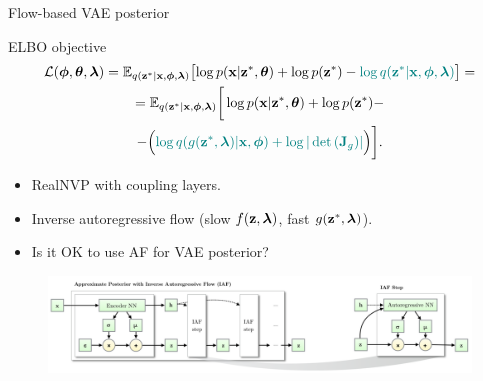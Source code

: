 \begin{frame}{Flow-based VAE posterior}
	\begin{block}{ELBO objective}
		\vspace{-0.5cm}
		{ \small
			\begin{multline*}
				\mathcal{L} (\boldsymbol{\phi}, \boldsymbol{\theta}, \boldsymbol{\lambda})  
				= \mathbb{E}_{q(\mathbf{z}^* | \mathbf{x}, \boldsymbol{\phi}, \boldsymbol{\lambda})} \bigl[\log p(\mathbf{x} | \mathbf{z}^*, \boldsymbol{\theta}) + \log p(\mathbf{z}^*) - {\color{teal}\log q(\mathbf{z}^*| \mathbf{x}, \boldsymbol{\phi}, \boldsymbol{\lambda})} \bigr] = \\
				= \mathbb{E}_{q(\mathbf{z}^* | \mathbf{x}, \boldsymbol{\phi}, \boldsymbol{\lambda})} \bigg[\log p(\mathbf{x}| \mathbf{z}^*, \boldsymbol{\theta})  + \log p(\mathbf{z}^*) - \\ - \Bigl({\color{teal}\log q(g(\mathbf{z}^*, \boldsymbol{\lambda}) | \mathbf{x}, \boldsymbol{\phi} ) + \log | \det \left( \mathbf{J}_g ) \right| }\Bigr)  \bigg].
			\end{multline*}
		}
		\vspace{-0.7cm}
	\end{block}
	\begin{itemize}
		\item RealNVP with coupling layers.
		\item Inverse autoregressive flow (slow $f(\mathbf{z}, \boldsymbol{\lambda})$, fast $g(\mathbf{z}^*, \boldsymbol{\lambda})$).
		\item {\color{gray}Is it OK to use AF for VAE posterior?}
	\end{itemize}
	\begin{figure}
		\includegraphics[width=\linewidth]{figs/iaf2.png}
	\end{figure}
	
\end{frame}
